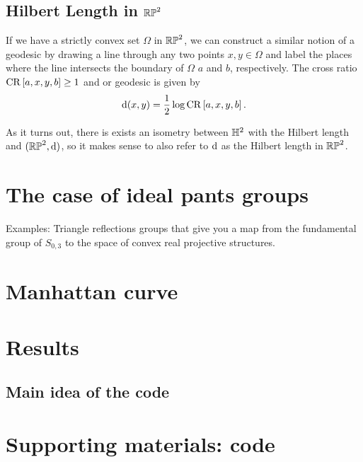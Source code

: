 \documentclass{amsart}
\begin{document}
	\subsection{Hilbert Length in $\mathbb{RP}^2$}
	
	If we have a strictly convex set $\Omega$ in $\mathbb{RP}^2$, we can construct a similar notion of a geodesic by drawing a line through any two points $x,y \in \Omega$ and label the places where the line intersects the boundary of $\Omega$ $a$ and $b$, respectively. The cross ratio $\operatorname{CR}\left[a,x,y,b\right] \geq 1$ and or geodesic is given by
	\begin{equation*}
		\operatorname{d}(x,y) = \frac{1}{2} \log \operatorname{CR}\left[a,x,y,b\right].
	\end{equation*}
	
	As it turns out, there is exists an isometry between $\mathbb{H}^2$ with the Hilbert length and $(\mathbb{RP}^2, \operatorname{d})$, so it makes sense to also refer to $\operatorname{d}$ as the Hilbert length in $\mathbb{RP}^2$. 
	
	\section{The case of ideal pants groups}
	Examples: Triangle reflections groups that give you a map from the fundamental group of $S_{0,3}$ to the space of convex real projective structures.
	
	\section{Manhattan curve}
	\section{Results}
	\subsection{Main idea of the code}
	\section{Supporting materials: code}
	
	\newpage
\end{document}
